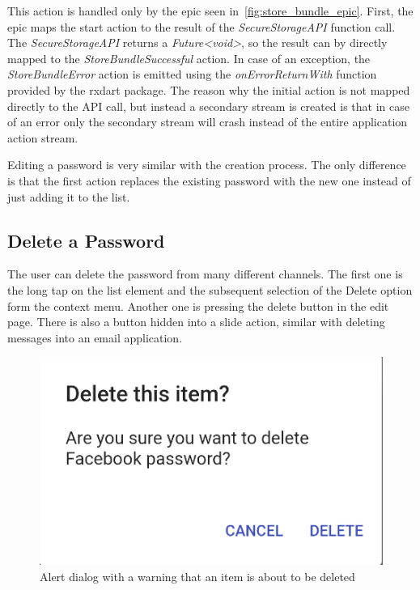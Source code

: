 \documentclass[a4paper,12pt]{report}
\begin{document}
This action is handled only by the epic seen
in~\autoref{fig:store_bundle_epic}. First, the epic maps the start action to
the result of the \textit{SecureStorageAPI} function call. The
\textit{SecureStorageAPI} returns a \textit{Future<void>}, so the result can by
directly mapped to the \textit{StoreBundleSuccessful} action. In case of an
exception, the \textit{StoreBundleError} action is emitted using the
\textit{onErrorReturnWith} function provided by the rxdart package. The reason
why the initial action is not mapped directly to the API call, but instead a
secondary stream is created is that in case of an error only the secondary
stream will crash instead of the entire application action stream.

Editing a password is very similar with the creation process. The only
difference is that the first action replaces the existing password with the new
one instead of just adding it to the list.

\subsection{Delete a Password}

The user can delete the password from many different channels. The first one is
the long tap on the list element and the subsequent selection of the Delete
option form the context menu. Another one is pressing the delete button in the
edit page. There is also a button hidden into a slide action, similar with
deleting messages into an email application.

\begin{figure}[H]
    \centering
    \includegraphics[scale=0.6]{images/app/warn_delete_password.png}
    \caption{Alert dialog with a warning that an item is about to be deleted}\label{fig:warn_delete_password}
\end{figure}
\end{document}
